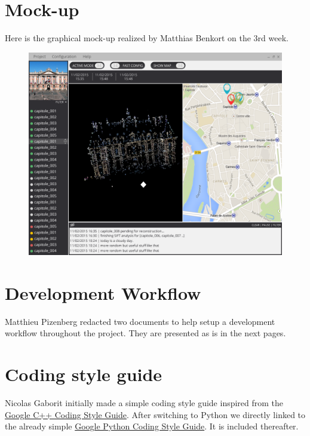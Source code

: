 \documentclass[a4paper]{report}
\begin{document}



\chapter{Mock-up}
Here is the graphical mock-up realized by Matthias Benkort on the 3rd
week.
\begin{figure}[!htbp]
  \centering
  \includegraphics[width=\linewidth]{appendix/design/MockupV0_1.png}
  \label{app:mockup}
\end{figure}
\restoregeometry


\chapter{Development Workflow}
Matthieu Pizenberg redacted two documents to help setup a development
workflow throughout the project. They are presented as is in the next
pages.

%

\chapter{Coding style guide}
Nicolas Gaborit initially made a simple coding style guide inspired
from the
\href{http://google-styleguide.googlecode.com/svn/trunk/cppguide.html}{Google
  C++ Coding Style Guide}. After switching to Python we directly
linked to the already simple
\href{http://google-styleguide.googlecode.com/svn/trunk/pyguide.html}{Google
  Python Coding Style Guide}. It is included thereafter.
\end{document}

